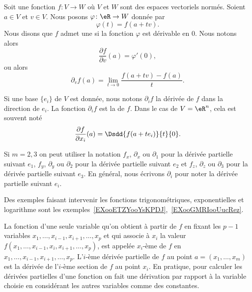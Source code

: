 \begin{definition}      \label{DEFooCATTooTPLtpR}
	Soit une fonction \( f\colon V\to W\) où \( V\) et \( W\) sont des espaces vectoriels normés. Soient \( a\in V\) et \( v\in V\). Nous posons \( \varphi\colon \eR\to W\) donnée par
	\begin{equation}
		\varphi(t)=f(a+tv).
	\end{equation}
	Nous disons que \( f\) admet une  si la fonction \( \varphi\) est dérivable en \( 0\). Nous notons alors
	\begin{equation}
		\frac{ \partial f }{ \partial v }(a)=\varphi'(0),
	\end{equation}
	ou alors
	\begin{equation}
		\partial_v f(a)=\lim_{t\to 0}\frac{f(a+tv)-f(a)}{t}.
	\end{equation}

	Si une base \( \{ e_i \}\) de \( V\) est donnée, nous notons \( \partial_if\) la dérivée de \( f\) dans la direction de \( e_i\). La fonction \( \partial_if\) est la  de \( f\). Dans le cas de \( V=\eR^n\), cela est souvent noté
	\begin{equation}
		\frac{ \partial f }{ \partial x_i }(a)=\Dsdd{ f(a+ te_i) }{t}{0}.
	\end{equation}
\end{definition}

Si \( m=2,3\) on peut utiliser la notation \( f_x\), \( \partial_x\)  ou \( \partial_1\) pour la dérivée partielle suivant \( e_1\), \( f_y\), \( \partial_y\)  ou \( \partial_2\)  pour la dérivée partielle suivant \( e_2\) et \( f_z\),  \( \partial_z\)  ou \( \partial_3\)  pour la dérivée partielle suivant \( e_3\). En général, nous écrivons \( \partial_i\) pour noter la dérivée partielle suivant \( e_i\).

Des exemples faisant intervenir les fonctions trigonométriques, exponentielles et logarithme sont les exemples~\ref{EXooETZYooYsKPDJ},~\ref{EXooGMRIooUucRez}.

La fonction d'une seule variable qu'on obtient à partir de \( f\) en fixant les \( p-1\) variables  \( x_1,\ldots, x_{i-1}, x_{i+1}, \ldots, x_p\) et qui associe à \( x_i\) la valeur \( f(x_1,\ldots, x_{i-1}, x_i, x_{i+1}, \ldots, x_p)\), est appelée \( x_i\)-ème  de \( f\) en \( x_1,\ldots, x_{i-1}, x_{i+1}, \ldots, x_p\). L'\( i\)-ème dérivée partielle de \( f\) au point \( a=(x_1,\ldots,x_m)\) est la dérivée de l'\( i\)-ème section de \( f\) au point \( x_i\). En pratique, pour calculer les dérivées partielles d'une fonction on fait une dérivation par rapport à la variable choisie en considérant les  autres variables comme des constantes.

